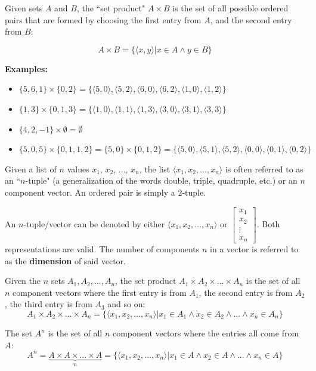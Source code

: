 \documentclass{article}
\begin{document}
Given sets \(A\) and \(B\), the ``set product" \(A \times B\) is the set of all possible ordered pairs that are formed by choosing the first entry from \(A\), and the second entry from \(B\): 

\[A \times B = \{\langle x, y \rangle | x \in A \wedge y \in B\}\]   

\textbf{Examples:}
\begin{itemize}
\item \(\{5, 6, 1\} \times \{0, 2\} = \{\langle 5, 0 \rangle, \langle 5, 2 \rangle, \langle 6, 0 \rangle, \langle 6, 2 \rangle, \langle 1, 0 \rangle, \langle 1, 2 \rangle\}\) 
\item \(\{1, 3\} \times \{0, 1, 3\} = \{\langle 1, 0 \rangle, \langle 1, 1 \rangle, \langle 1, 3 \rangle, \langle 3, 0 \rangle, \langle 3, 1 \rangle, \langle 3, 3 \rangle\}\) 
\item \(\{4, 2, -1\} \times \emptyset = \emptyset\)   
\item \(\{5, 0, 5\} \times \{0, 1, 1, 2\} = \{5, 0\} \times \{0, 1, 2\} = \{\langle 5, 0 \rangle, \langle 5, 1 \rangle, \langle 5, 2 \rangle, \langle 0, 0 \rangle, \langle 0, 1 \rangle, \langle 0, 2 \rangle\}\)
\end{itemize}

Given a list of \(n\) values \(x_1\), \(x_2\), ..., \(x_n\), the list \(\langle x_1, x_2, ..., x_n \rangle\) is often referred to as an ``\(n\)-tuple" (a generalization of the words double, triple, quadruple, etc.) or an \(n\) component vector. An ordered pair is simply a \(2\)-tuple. 

An \(n\)-tuple/vector can be denoted by either \(\langle x_1, x_2, ..., x_n \rangle\) or \(\begin{bmatrix} x_1 \\ x_2 \\ \vdots \\ x_n \end{bmatrix}\). Both representations are valid. The number of components \(n\) in a vector is referred to as the {\bf dimension} of said vector.

Given the \(n\) sets \(A_1, A_2, ..., A_n\), the set product \(A_1 \times A_2 \times ... \times A_n\) is the set of all \(n\) component vectors where the first entry is from \(A_1\), the second entry is from \(A_2\), the third entry is from \(A_3\) and so on:
\[A_1 \times A_2 \times ... \times A_n = \{\langle x_1, x_2, ..., x_n \rangle | x_1 \in A_1 \wedge x_2 \in A_2 \wedge ... \wedge x_n \in A_n\}\] 

The set \(A^n\) is the set of all \(n\) component vectors where the entries all come from \(A\):
\[A^n = \underbrace{A \times A \times ... \times A}_n = \{\langle x_1, x_2, ..., x_n \rangle | x_1 \in A \wedge x_2 \in A \wedge ... \wedge x_n \in A\}\]
\end{document}
